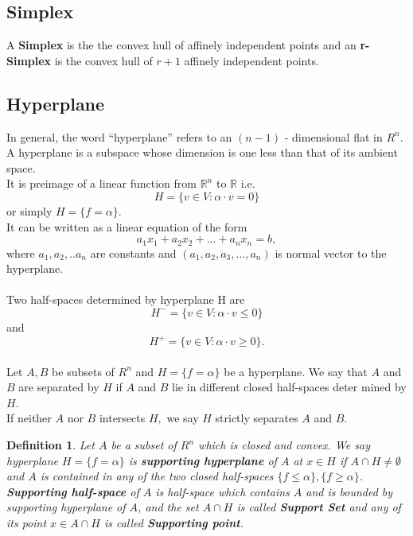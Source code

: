 \documentclass[oneside]{book}
\newtheorem{mydef}{Definition}[section]
\begin{document}
	
	\subsection{Simplex} 
	\label{ss:8}
	A \textbf{Simplex} is the the convex hull of affinely independent points and  an \newline 
	\textbf{r-Simplex} is the convex hull of $r+ 1$ affinely independent points.
	
	
	
	
	
	
	
	
	
	\subsection{Hyperplane} 
	\label{ss:9}
	In general, the word “hyperplane” refers to an $( n-1 )$ - dimensional flat in $R^{n}$. \\
	A hyperplane is a subspace whose dimension is one less than that of its ambient space.  
	\\ It is preimage of a  linear function from $\mathbb{R}^{n}$ to $\mathbb{R}$ i.e.
	\begin{equation}
	H=\{v \in V: \alpha \cdot v=0\} 
	\end{equation}  
	or simply  $H = \{f = \alpha \}$. \\ 
	It can be written as a linear equation of the form
	$$a_1x_1 + a_2x_2 + ... + a_nx_n = b,$$
	where $a_1,a_2,..a_n$ are constants and $(a_1,a_2,a_3,...,a_n)$ is normal vector to the hyperplane.
	\\\\
	Two half-spaces determined by hyperplane H are 
	$$H^{-}=\{v \in V: \alpha \cdot v \leq 0\}$$ and  $$ H^{+}=\{v \in V: \alpha \cdot v \geq 0\}. $$ 
	\\
	Let $A, B$ be subsets of $R^{n}$ and $H=\{f=\alpha\}$ be a hyperplane. We say that $A$ and
	$B$ are separated by $H$ if $A$ and $B$ lie in different closed half-spaces deter
	mined by $H . $  \\
	If neither $A$ nor $B$ intersects $H,$ we say $H$ strictly separates $A$
	and $B .$\\
	
	
	
	
	
	\begin{mydef} \label{d:3}
		Let $A$ be a subset of $R^{n}$ which is closed and convex. We say hyperplane  $H=\{f=\alpha\}$ is \textbf{supporting hyperplane} of $A$ at  $x \in H$  if $A \cap H \neq \emptyset$ and $A$ is contained in any of the two closed half-spaces $\{f \leq \alpha\}, \{f \geq \alpha\}$.
		\\
		
		\textbf{ Supporting half-space} of $A$ is half-space which contains $A$ and is bounded by supporting hyperplane of $A$, and the set $A \cap H$ is called \textbf{Support Set} and any of its point $x \in A \cap H$ is called \textbf{Supporting point}.
	\end{mydef}
	
\end{document}
